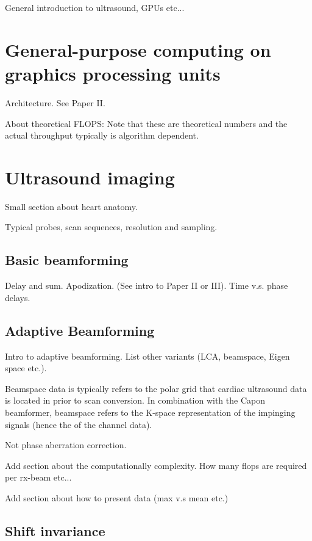%

General introduction to ultrasound, GPUs etc...

\section{General-purpose computing on graphics processing units}

Architecture. See Paper II.

About theoretical FLOPS: Note that these are theoretical numbers and the actual throughput typically is algorithm dependent.

\section {Ultrasound imaging}

Small section about heart anatomy.

Typical probes, scan sequences, resolution and sampling.
							
\subsection{Basic beamforming}

Delay and sum. Apodization. (See intro to Paper II or III).
Time v.s. phase delays.

\subsection{Adaptive Beamforming}\label{sec:adaptbf}

Intro to adaptive beamforming. List other variants (LCA, beamspace, Eigen space etc.). 

Beamspace data is typically refers to the polar grid that cardiac ultrasound data is located in prior to scan conversion. In combination with the Capon beamformer, beamspace refers to the K-space representation of the impinging signals (hence the  of the channel data). 

Not phase aberration correction.

Add section about the computationally complexity. How many flops are required per rx-beam etc...

Add section about how to present data (max v.s mean etc.)
						
\subsection{Shift invariance}

